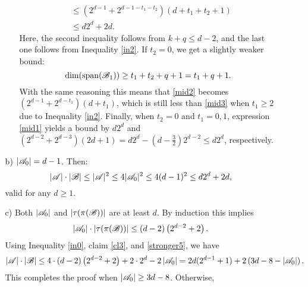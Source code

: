 \begin{enumerate}
\begin{enumerate}
\begin{enumerate}
\begin{align}
                    & \leq \left(2^{d-1} + 2^{d-1-t_1-t_2}\right)\left(d+t_1+t_2+1\right) \nonumber \\
                    & \leq d2^d + 2d. \label{mid3}             
                \end{align}
          Here, the second inequality follows from $k+q\leq d-2$, and the last one follows from Inequality \ref{in2}. If $t_2=0$, we get a slightly weaker bound:
                \begin{equation*}
                    \operatorname{dim}(\operatorname{span}({\mathscr{B}}_1)) \geq t_1+t_2+q+1 =t_1+q+1. \end{equation*}
                With the same reasoning this means that \eqref{mid2} becomes $\left(2^{d-1} + 2^{d-t_1}\right)\left(d+t_1\right)$, which is still less than \eqref{mid3} when $t_1\geq2$ due to Inequality \ref{in2}. Finally, when $t_2=0$ and $t_1=0, 1$, expression \eqref{mid1} yields a bound by $d2^d$ and $(2^{d-2}+2^{d-3})(2d+1)=d 2^d - \left(d-\frac{3}{2}\right)2^{d-2}\leq d2^d$, respectively.
            \end{enumerate}
            \item[b)] $|{\mathscr{A}}_0|=d-1$. Then:
            \begin{equation*}
                |{\mathscr{A}}|\cdot|{\mathscr{B}}|\leq|{\mathscr{A}}|^2\leq4|{\mathscr{A}}_0|^2\leq4(d-1)^2\leq d2^d+2d, 
            \end{equation*}
            valid for any $d\ge 1.$
            \item[c)] Both $|{\mathscr{A}}_0|$ and $|\tau(\pi({\mathscr{B}}))|$ are at least $d$. By induction this implies 
            \[
            \left|{\mathscr{A}}_0\right|\cdot\left|\tau(\pi({\mathscr{B}}))\right|\leq\left(d-2\right)\left(2^{d-2}+2\right).
            \]
            Using Inequality \ref{in0}, claim \ref{cl3}, and \eqref{stronger5}, we have 
            \begin{equation*}
                \left|{\mathscr{A}}\right|\cdot\left|{\mathscr{B}}\right| \leq 4\cdot\left(d-2\right)\left(2^{d-2}+2\right)+2 \cdot 2^d - 2\left|{\mathscr{A}}_0\right| = 2d(2^{d-1}+1)+2\left(3d-8-\left|{\mathscr{A}}_0\right|\right).
            \end{equation*}
            This completes the proof when $\left|{\mathscr{A}}_0\right|\geq3d-8$. Otherwise,

\end{enumerate}
\end{enumerate}

